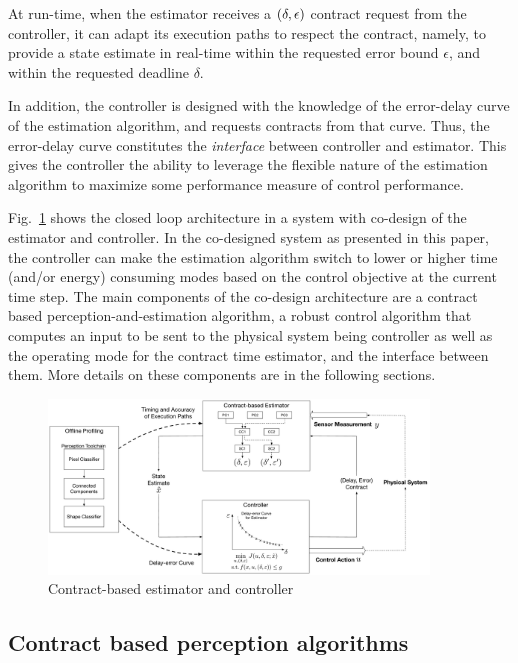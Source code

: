 At run-time, when the estimator receives a $(\delta,\epsilon)$ contract request from the controller, it can adapt its execution paths to respect the contract, namely, to provide a state estimate in real-time within the requested error bound $\epsilon$, and within the requested deadline $\delta$.

In addition, the controller is designed with the knowledge of the error-delay curve of the estimation algorithm, and requests contracts from that curve.
Thus, the error-delay curve constitutes the \textit{interface} between controller and estimator.
This gives the controller the ability to leverage the flexible nature of the estimation algorithm to maximize some performance measure of control performance. %

Fig.~\ref{fig:fullcodesignedCE} shows the closed loop architecture in a system with co-design of the estimator and controller.
In the co-designed system as presented in this paper, the controller can make the estimation algorithm switch to lower or higher time (and/or energy) consuming modes based on the control objective at the current time step.
The main components of the co-design architecture are a contract based perception-and-estimation algorithm, a robust control algorithm that computes an input to be sent to the physical system being controller as well as the operating mode for the contract time estimator, and the interface between them. More details on these components are in the following sections.

\begin{figure}[t]
	\centering
	\includegraphics[width=0.9\textwidth]{figures/omnigraffle_figures/process_figure2}
	\caption{Contract-based estimator and controller}
	\label{fig:fullcodesignedCE}
\end{figure}
\subsection{Contract based perception algorithms}


